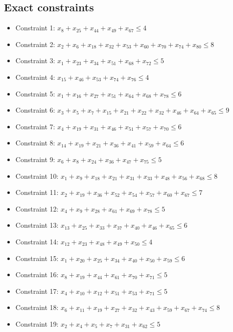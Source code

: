\documentclass[11pt]{article}
\begin{document}
\subsection*{Exact constraints}
\begin{itemize}
\item Constraint 1: $x_{8} + x_{25} + x_{44} + x_{49} + x_{67} \le 4$
\item Constraint 2: $x_{2} + x_{6} + x_{18} + x_{32} + x_{53} + x_{60} + x_{70} + x_{74} + x_{80} \le 8$
\item Constraint 3: $x_{1} + x_{23} + x_{34} + x_{51} + x_{68} + x_{72} \le 5$
\item Constraint 4: $x_{15} + x_{46} + x_{53} + x_{74} + x_{76} \le 4$
\item Constraint 5: $x_{1} + x_{16} + x_{27} + x_{51} + x_{64} + x_{68} + x_{78} \le 6$
\item Constraint 6: $x_{3} + x_{5} + x_{7} + x_{15} + x_{21} + x_{22} + x_{32} + x_{46} + x_{64} + x_{65} \le 9$
\item Constraint 7: $x_{4} + x_{19} + x_{31} + x_{46} + x_{51} + x_{57} + x_{70} \le 6$
\item Constraint 8: $x_{14} + x_{19} + x_{21} + x_{36} + x_{41} + x_{59} + x_{64} \le 6$
\item Constraint 9: $x_{6} + x_{8} + x_{24} + x_{36} + x_{47} + x_{75} \le 5$
\item Constraint 10: $x_{1} + x_{9} + x_{18} + x_{21} + x_{31} + x_{33} + x_{48} + x_{56} + x_{68} \le 8$
\item Constraint 11: $x_{2} + x_{19} + x_{36} + x_{52} + x_{54} + x_{57} + x_{60} + x_{67} \le 7$
\item Constraint 12: $x_{4} + x_{9} + x_{28} + x_{61} + x_{69} + x_{78} \le 5$
\item Constraint 13: $x_{13} + x_{25} + x_{33} + x_{37} + x_{40} + x_{46} + x_{65} \le 6$
\item Constraint 14: $x_{12} + x_{23} + x_{48} + x_{49} + x_{50} \le 4$
\item Constraint 15: $x_{1} + x_{20} + x_{25} + x_{34} + x_{40} + x_{50} + x_{59} \le 6$
\item Constraint 16: $x_{8} + x_{19} + x_{44} + x_{61} + x_{70} + x_{71} \le 5$
\item Constraint 17: $x_{4} + x_{10} + x_{12} + x_{51} + x_{53} + x_{71} \le 5$
\item Constraint 18: $x_{6} + x_{11} + x_{19} + x_{27} + x_{32} + x_{43} + x_{59} + x_{67} + x_{74} \le 8$
\item Constraint 19: $x_{2} + x_{4} + x_{5} + x_{7} + x_{31} + x_{62} \le 5$

\end{itemize}
\end{document}
